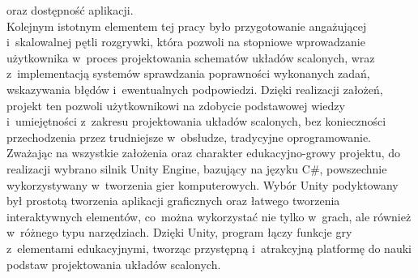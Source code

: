 oraz dostępność aplikacji.\\
\indent Kolejnym istotnym elementem tej pracy było przygotowanie angażującej
i~skalowalnej pętli rozgrywki,
która pozwoli na stopniowe wprowadzanie użytkownika w~proces projektowania schematów układów scalonych,
wraz z~implementacją systemów sprawdzania poprawności wykonanych zadań, wskazywania błędów i~ewentualnych podpowiedzi.
Dzięki realizacji założeń, projekt ten pozwoli użytkownikowi na zdobycie podstawowej wiedzy
i~umiejętności z~zakresu projektowania układów scalonych,
bez konieczności przechodzenia przez trudniejsze w~obsłudze, tradycyjne oprogramowanie.\\
\indent Zważając na wszystkie założenia oraz charakter edukacyjno-growy projektu,
do realizacji wybrano silnik Unity Engine,
bazujący na języku C\#,
powszechnie wykorzystywany w~tworzenia gier komputerowych.
Wybór Unity podyktowany był prostotą tworzenia aplikacji graficznych oraz łatwego tworzenia interaktywnych elementów,
co~można wykorzystać nie tylko w~grach, ale również w~różnego typu narzędziach.
Dzięki Unity,
program łączy funkcje gry z~elementami edukacyjnymi,
tworząc przystępną i~atrakcyjną platformę do nauki podstaw projektowania układów scalonych.
